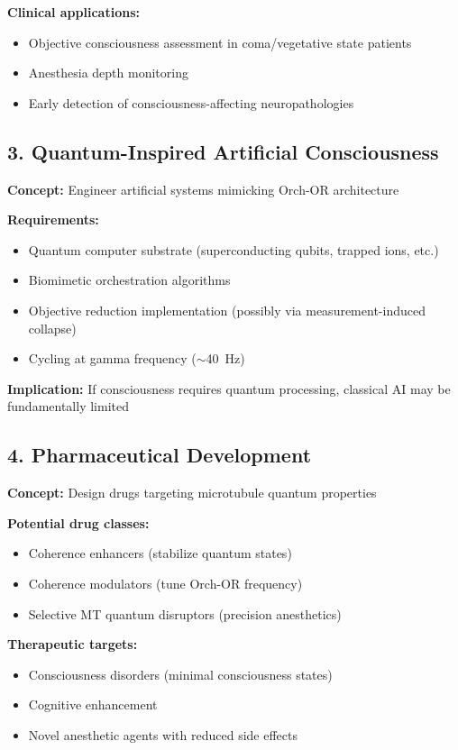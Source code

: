 \textbf{Clinical applications:}
\begin{itemize}
\item Objective consciousness assessment in coma/vegetative state patients
\item Anesthesia depth monitoring
\item Early detection of consciousness-affecting neuropathologies
\end{itemize}

\subsection{3. Quantum-Inspired Artificial Consciousness}

\textbf{Concept:} Engineer artificial systems mimicking Orch-OR architecture

\textbf{Requirements:}
\begin{itemize}
\item Quantum computer substrate (superconducting qubits, trapped ions, etc.)
\item Biomimetic orchestration algorithms
\item Objective reduction implementation (possibly via measurement-induced collapse)
\item Cycling at gamma frequency ($\sim$40~Hz)
\end{itemize}

\textbf{Implication:} If consciousness requires quantum processing, classical AI may be fundamentally limited

\subsection{4. Pharmaceutical Development}

\textbf{Concept:} Design drugs targeting microtubule quantum properties

\textbf{Potential drug classes:}
\begin{itemize}
\item Coherence enhancers (stabilize quantum states)
\item Coherence modulators (tune Orch-OR frequency)
\item Selective MT quantum disruptors (precision anesthetics)
\end{itemize}

\textbf{Therapeutic targets:}
\begin{itemize}
\item Consciousness disorders (minimal consciousness states)
\item Cognitive enhancement
\item Novel anesthetic agents with reduced side effects
\end{itemize}

